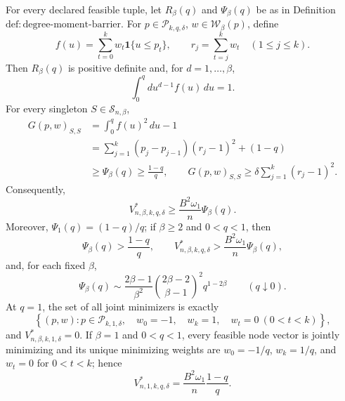 For every declared feasible tuple, let \(R_\beta(q)\) and \(\Psi_\beta(q)\) be as in Definition~\(\mathrm{def{:}degree\text{-}moment\text{-}barrier}\).  For \(p\in\mathcal P_{k,q,\delta}\), \(w\in\mathcal W_\beta(p)\), define
\[
f(u)=\sum_{t=0}^kw_t\mathbf 1\{u\le p_t\},
\qquad r_j=\sum_{t=j}^kw_t\quad(1\le j\le k).
\]
Then \(R_\beta(q)\) is positive definite and, for \(d=1,\ldots,\beta\),
\[
\int_0^q d u^{d-1}f(u)\,du=1.
\]
For every singleton \(S\in\mathcal S_{n,\beta}\),
\[
\begin{aligned}
G(p,w)_{S,S}
&=\int_0^q f(u)^2\,du-1\\
&=\sum_{j=1}^k(p_j-p_{j-1})(r_j-1)^2+(1-q)\\
&\ge \Psi_\beta(q)\ge\frac{1-q}{q},
\qquad
G(p,w)_{S,S}\ge\delta\sum_{j=1}^k(r_j-1)^2.
\end{aligned}
\]
Consequently,
\[
V^*_{n,\beta,k,q,\delta}\ge
\frac{B^2\omega_1}{n}\Psi_\beta(q).
\]
Moreover, \(\Psi_1(q)=(1-q)/q\); if \(\beta\ge2\) and \(0<q<1\), then
\[
\Psi_\beta(q)>\frac{1-q}{q},
\qquad
V^*_{n,\beta,k,q,\delta}>
\frac{B^2\omega_1}{n}\Psi_\beta(q),
\]
and, for each fixed \(\beta\),
\[
\Psi_\beta(q)\sim
\frac{2\beta-1}{\beta^2}
\binom{2\beta-2}{\beta-1}^{\!2}q^{1-2\beta}
\qquad(q\downarrow0).
\]
At \(q=1\), the set of all joint minimizers is exactly
\[
\left\{(p,w):p\in\mathcal P_{k,1,\delta},\quad
w_0=-1,\quad w_k=1,\quad w_t=0\ (0<t<k)\right\},
\]
and \(V^*_{n,\beta,k,1,\delta}=0\).  If \(\beta=1\) and \(0<q<1\), every feasible node vector is jointly minimizing and its unique minimizing weights are \(w_0=-1/q\), \(w_k=1/q\), and \(w_t=0\) for \(0<t<k\); hence
\[
V^*_{n,1,k,q,\delta}=\frac{B^2\omega_1}{n}\frac{1-q}{q}.
\]